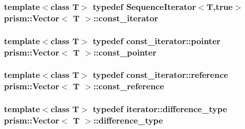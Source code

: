 \subsubsection[{\texorpdfstring{const\+\_\+iterator}{const_iterator}}]{\setlength{\rightskip}{0pt plus 5cm}template$<$class T$>$ typedef {\bf Sequence\+Iterator}$<$T,true$>$ {\bf prism\+::\+Vector}$<$ T $>$\+::{\bf const\+\_\+iterator}}\hypertarget{classprism_1_1_vector_a4ae2d663b42920c426b768119bf9c770}{}\label{classprism_1_1_vector_a4ae2d663b42920c426b768119bf9c770}
\subsubsection[{\texorpdfstring{const\+\_\+pointer}{const_pointer}}]{\setlength{\rightskip}{0pt plus 5cm}template$<$class T$>$ typedef {\bf const\+\_\+iterator\+::pointer} {\bf prism\+::\+Vector}$<$ T $>$\+::{\bf const\+\_\+pointer}}\hypertarget{classprism_1_1_vector_a0bf16322f83f0ad9103815a1cac16156}{}\label{classprism_1_1_vector_a0bf16322f83f0ad9103815a1cac16156}
\subsubsection[{\texorpdfstring{const\+\_\+reference}{const_reference}}]{\setlength{\rightskip}{0pt plus 5cm}template$<$class T$>$ typedef {\bf const\+\_\+iterator\+::reference} {\bf prism\+::\+Vector}$<$ T $>$\+::{\bf const\+\_\+reference}}\hypertarget{classprism_1_1_vector_a75325487acaa0f63496c110e5a5632bb}{}\label{classprism_1_1_vector_a75325487acaa0f63496c110e5a5632bb}
\subsubsection[{\texorpdfstring{difference\+\_\+type}{difference_type}}]{\setlength{\rightskip}{0pt plus 5cm}template$<$class T$>$ typedef {\bf iterator\+::difference\+\_\+type} {\bf prism\+::\+Vector}$<$ T $>$\+::{\bf difference\+\_\+type}}\hypertarget{classprism_1_1_vector_a5fe3b74bfb30d75aa74d4d896e6b7227}{}\label{classprism_1_1_vector_a5fe3b74bfb30d75aa74d4d896e6b7227}
